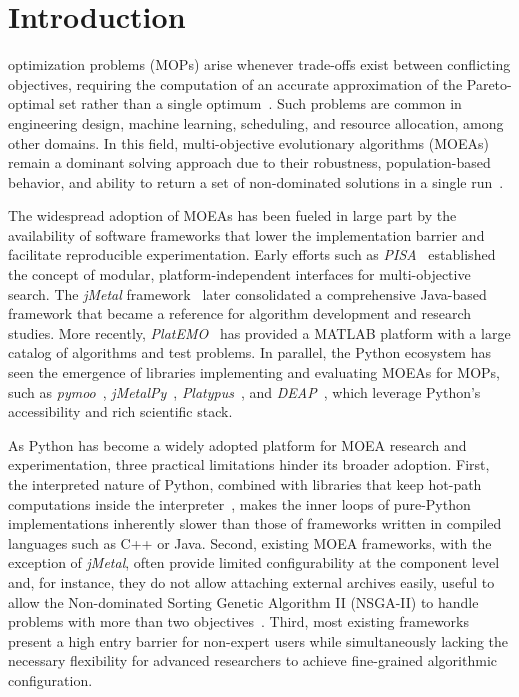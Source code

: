 \documentclass[journal]{IEEEtran}
\begin{document}
\IEEEpeerreviewmaketitle

\section{Introduction} \label{sec:intro}

 optimization problems (MOPs) arise whenever trade-offs exist between conflicting objectives, requiring the computation of an accurate approximation of the Pareto-optimal set rather than a single optimum~\cite{deb01}. Such problems are common in engineering design, machine learning, scheduling, and resource allocation, among other domains. In this field, multi-objective evolutionary algorithms (MOEAs) remain a dominant solving approach due to their robustness, population-based behavior, and ability to return a set of non-dominated solutions in a single run~\cite{CLV07}.

The widespread adoption of MOEAs has been fueled in large part by the availability of software frameworks that lower the implementation barrier and facilitate reproducible experimentation. Early efforts such as \textit{PISA}~\cite{BLT+03} established the concept of modular, platform-independent interfaces for multi-objective search. The \textit{jMetal} framework~\cite{DN11} later consolidated a comprehensive Java-based framework that became a reference for algorithm development and research studies. More recently, \textit{PlatEMO}~\cite{TCZ+17} has provided a MATLAB platform with a large catalog of algorithms and test problems. In parallel, the Python ecosystem has seen the emergence of libraries implementing and evaluating MOEAs for MOPs, such as \textit{pymoo}~\cite{BD20}, \textit{jMetalPy}~\cite{BNG+19}, \textit{Platypus}~\cite{hadka15}, and \textit{DEAP}~\cite{FDG+12}, which leverage Python's accessibility and rich scientific stack. 

As Python has become a widely adopted platform for MOEA research and experimentation, three practical limitations hinder its broader adoption. First, the interpreted nature of Python, combined with libraries that keep hot-path computations inside the interpreter~\cite{BNG+19,FDG+12,hadka15}, makes the inner loops of pure-Python implementations inherently slower than those of frameworks written in compiled languages such as C++ or Java. Second, existing MOEA frameworks, with the exception of \textit{jMetal}, often provide limited configurability at the component level and, for instance, they do not allow attaching external archives easily, useful to allow the Non-dominated Sorting Genetic Algorithm II (NSGA-II) to handle problems with more than two objectives~\cite{IPS20}. Third, most existing frameworks present a high entry barrier for non-expert users while simultaneously lacking the necessary flexibility for advanced researchers to achieve fine-grained algorithmic configuration. 
\end{document}
